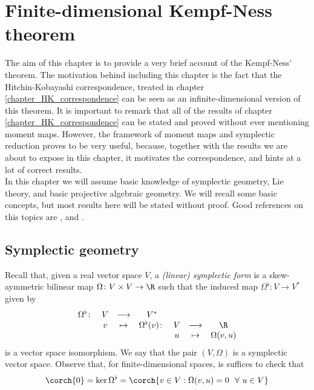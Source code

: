 \chapter{Finite-dimensional Kempf-Ness theorem} \label{chapter_kempf_Ness}
The aim of this chapter is to provide a very brief account of the Kempf-Ness' theorem. The motivation behind including this chapter is the fact that the Hitchin-Kobayashi correspondence, treated in chapter \ref{chapter_HK_correspondence} can be seen as an infinite-dimensional version of this theorem. It is important to remark that all of the results of chapter \ref{chapter_HK_correspondence} can be stated and proved without ever mentioning moment maps. However, the framework of moment maps and symplectic reduction proves to be very useful, because, together with the results we are about to expose in this chapter, it motivates the correspondence, and hints at a lot of correct results. \\

In this chapter we will assume basic knowledge of symplectic geometry, Lie theory, and basic projective algebraic geometry. We will recall some basic concepts, but most results here will be stated without proof. Good references on this topics are \parencite{da2001lectures}, \parencite{hoskins} and \parencite{hilgert2011structure}.


\section{Symplectic geometry}

Recall that, given a real vector space \(V\), a \textit{(linear) symplectic form} is a skew-aymmetric bilinear map \(\Omega\colon V \times V \to \R\) such that the induced map \(\Omega^\flat \colon  V \to V^*\) given by 
\begin{equation} \label{isomorph_sympl_form}
\begin{array}{ccccccc} 
    \Omega^\flat \colon & V & \longrightarrow & V^* & &  \\
    & v & \mapsto & \Omega^\flat(v) \colon & V & \longrightarrow & \R\\
    & & & & u & \mapsto & \Omega(v,u)
\end{array}
\end{equation}
is a vector space isomorphism. We say that the pair \((V, \Omega)\) is a symplectic vector space. Observe that, for finite-dimensional spaces, is suffices to check that 
\[
\corch{0}=\ker \Omega^\flat=\corch{v \in V: \Omega(v,u)=0 \ \ \forall \ u \in V}
\]

